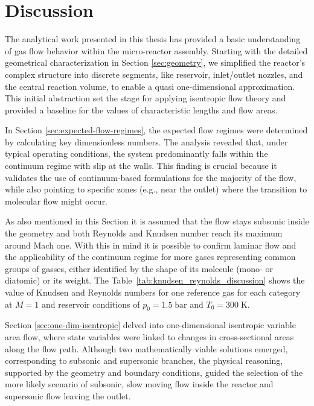 \section*{Discussion}
The analytical work presented in this thesis has provided a basic understanding of gas flow behavior within the micro-reactor assembly.
Starting with the detailed geometrical characterization in Section \ref{sec:geometry}, we simplified the reactor’s complex structure into discrete segments, like reservoir, inlet/outlet nozzles, and the central reaction volume, to enable a quasi one-dimensional approximation.
This initial abstraction set the stage for applying isentropic flow theory and provided a baseline for the values of characteristic lengths and flow areas.

In Section \ref{sec:expected-flow-regimes}, the expected flow regimes were determined by calculating key dimensionless numbers.
The analysis revealed that, under typical operating conditions, the system predominantly falls within the continuum regime with slip at the walls.
This finding is crucial because it validates the use of continuum-based formulations for the majority of the flow, while also pointing to specific zones (e.g., near the outlet) where the transition to molecular flow might occur.

As also mentioned in this Section it is assumed that the flow stays subsonic inside the geometry and both Reynolds and Knudsen number reach its maximum around Mach one.
With this in mind it is possible to confirm laminar flow and the applicability of the continuum regime for more gases representing common groups of gasses, either identified by the shape of its molecule (mono- or diatomic) or its weight.
The Table~\ref{tab:knudsen_reynolds_discussion} shows the value of Knudsen and Reynolds numbers for one reference gas for each category at $M = 1$ and reservoir conditions of $p_0 = 1.5 \; \text{bar}$ and $T_0 = 300\;\text{K}$.



Section \ref{sec:one-dim-isentropic} delved into one-dimensional isentropic variable area flow, where state variables were linked to changes in cross-sectional areas along the flow path.
Although two mathematically viable solutions emerged, corresponding to subsonic and supersonic branches, the physical reasoning, supported by the geometry and boundary conditions, guided the selection of the more likely scenario of subsonic, slow moving flow inside the reactor and supersonic flow leaving the outlet.

